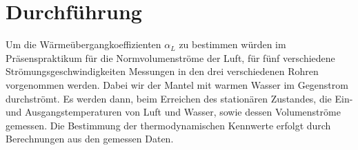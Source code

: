\section{Durchführung}
\label{sec:durchfuerung}

Um die Wärmeübergangkoeffizienten $\alpha_L$ zu bestimmen würden im Präsenspraktikum für die Normvolumenströme der Luft, für fünf verschiedene Strömungsgeschwindigkeiten Messungen in den drei verschiedenen Rohren vorgenommen werden. Dabei wir der Mantel mit warmen Wasser im Gegenstrom durchströmt. Es werden dann, beim Erreichen des stationären Zustandes, die Ein- und Ausgangstemperaturen von Luft und Wasser, sowie dessen Volumenströme gemessen. Die Bestimmung der thermodynamischen Kennwerte erfolgt durch Berechnungen aus den gemessen Daten.